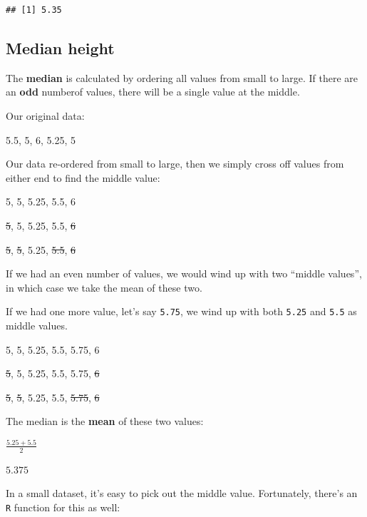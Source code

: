 \documentclass[
]{book}
\newenvironment{Shaded}{\begin{snugshade}}{\end{snugshade}}
\newcommand{\DocumentationTok}[1]{\textcolor[rgb]{0.56,0.35,0.01}{\textbf{\textit{#1}}}}
\newcommand{\FunctionTok}[1]{\textcolor[rgb]{0.13,0.29,0.53}{\textbf{#1}}}
\newcommand{\NormalTok}[1]{#1}
\newcommand{\SpecialCharTok}[1]{\textcolor[rgb]{0.81,0.36,0.00}{\textbf{#1}}}
\begin{document}
\begin{Shaded}
\end{Shaded}

\begin{verbatim}
## [1] 5.35
\end{verbatim}

\hypertarget{median-height}{%
\subsection{Median height}\label{median-height}}

The \textbf{median} is calculated by ordering all values from small to large. If there are an \textbf{odd} numberof values, there will be a single value at the middle.

Our original data:

5.5, 5, 6, 5.25, 5

Our data re-ordered from small to large, then we simply cross off values from either end to find the middle value:

5, 5, 5.25, 5.5, 6

\st{5}, 5, 5.25, 5.5, \st{6}

\st{5}, \st{5}, 5.25, \st{5.5}, \st{6}

If we had an even number of values, we would wind up with two ``middle values'', in which case we take the mean of these two.

If we had one more value, let's say \texttt{5.75}, we wind up with both \texttt{5.25} and \texttt{5.5} as middle values.

5, 5, 5.25, 5.5, 5.75, 6

\st{5}, 5, 5.25, 5.5, 5.75, \st{6}

\st{5}, \st{5}, 5.25, 5.5, \st{5.75}, \st{6}

The median is the \textbf{mean} of these two values:

\(\frac{5.25+5.5}{2}\)

\(5.375\)

In a small dataset, it's easy to pick out the middle value. Fortunately, there's an \texttt{R} function for this as well:

\begin{Shaded}
\end{Shaded}
\end{document}
